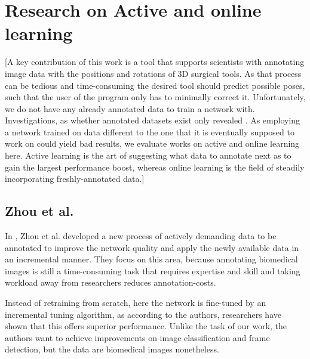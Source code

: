 \section{Research on Active and online learning}

[A key contribution of this work is a tool that supports scientists with annotating image data with the positions and rotations of 3D surgical tools. As that process can be tedious and time-consuming the desired tool should predict possible poses, such that the user of the program only has to minimally correct it. Unfortunately, we do not have any already annotated data to train a network with. Investigations, as whether annotated datasets exist only revealed \cite{website}. As employing a network trained on data different to the one that it is eventually supposed to work on could yield bad results, we evaluate works on active and online learning here. Active learning is the art of suggesting what data to annotate next as to gain the largest performance boost, whereas online learning is the field of steadily incorporating freshly-annotated data.]

\subsection{Zhou et al.}

In \cite{zhou}, Zhou et al. developed a new process of actively demanding data to be annotated to improve the network quality and apply the newly available data in an incremental manner. They focus on this area, because annotating biomedical images is still a time-consuming task that requires expertise and skill and taking workload away from researchers reduces annotation-costs.

Instead of retraining from scratch, here the network is fine-tuned by an incremental tuning algorithm, as according to the authors, researchers have shown that this offers superior performance. Unlike the task of our work, the authors want to achieve improvements on image classification and frame detection, but the data are biomedical images nonetheless.   
